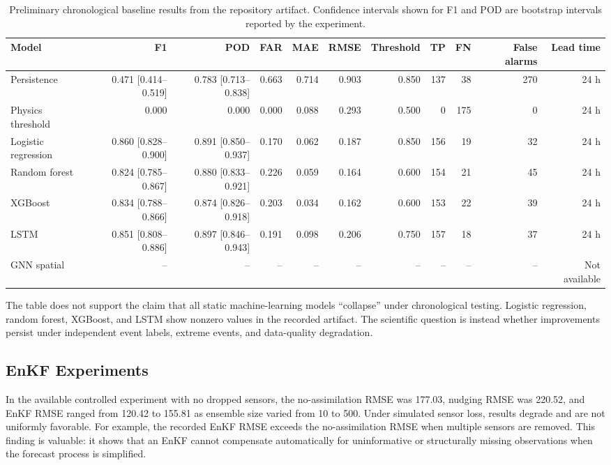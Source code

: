 \documentclass[journal]{IEEEtran}
\begin{document}
\begin{table}[t]
\caption{Preliminary chronological baseline results from the repository artifact. Confidence intervals shown for F1 and POD are bootstrap intervals reported by the experiment.}
\label{tab:base}
\centering\footnotesize
\begin{tabular}{lrrrrrrrrrr}
\toprule
Model & F1 & POD & FAR & MAE & RMSE & Threshold & TP & FN & False alarms & Lead time \\
\midrule
Persistence & 0.471 [0.414--0.519] & 0.783 [0.713--0.838] & 0.663 & 0.714 & 0.903 & 0.850 & 137 & 38 & 270 & 24 h \\
Physics threshold & 0.000 & 0.000 & 0.000 & 0.088 & 0.293 & 0.500 & 0 & 175 & 0 & 24 h \\
Logistic regression & 0.860 [0.828--0.900] & 0.891 [0.850--0.937] & 0.170 & 0.062 & 0.187 & 0.850 & 156 & 19 & 32 & 24 h \\
Random forest & 0.824 [0.785--0.867] & 0.880 [0.833--0.921] & 0.226 & 0.059 & 0.164 & 0.600 & 154 & 21 & 45 & 24 h \\
XGBoost & 0.834 [0.788--0.866] & 0.874 [0.826--0.918] & 0.203 & 0.034 & 0.162 & 0.600 & 153 & 22 & 39 & 24 h \\
LSTM & 0.851 [0.808--0.886] & 0.897 [0.846--0.943] & 0.191 & 0.098 & 0.206 & 0.750 & 157 & 18 & 37 & 24 h \\
GNN spatial & -- & -- & -- & -- & -- & -- & -- & -- & -- & Not available \\
\bottomrule
\end{tabular}
\end{table}

The table does not support the claim that all static machine-learning models ``collapse'' under chronological testing. Logistic regression, random forest, XGBoost, and LSTM show nonzero values in the recorded artifact. The scientific question is instead whether improvements persist under independent event labels, extreme events, and data-quality degradation.

\subsection{EnKF Experiments}
In the available controlled experiment with no dropped sensors, the no-assimilation RMSE was 177.03, nudging RMSE was 220.52, and EnKF RMSE ranged from 120.42 to 155.81 as ensemble size varied from 10 to 500. Under simulated sensor loss, results degrade and are not uniformly favorable. For example, the recorded EnKF RMSE exceeds the no-assimilation RMSE when multiple sensors are removed. This finding is valuable: it shows that an EnKF cannot compensate automatically for uninformative or structurally missing observations when the forecast process is simplified.
\end{document}
